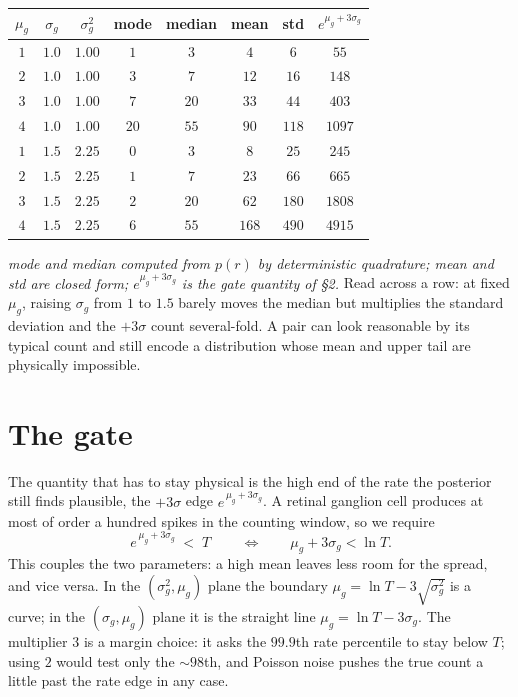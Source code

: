 \documentclass[11pt]{article}
\begin{document}
\begin{center}
\small
\begin{tabular}{cccccccc}
\hline
$\mu_g$ & $\sigma_g$ & $\sigma_g^2$ & mode & median & mean & std & $e^{\mu_g+3\sigma_g}$\\
\hline
$1$ & $1.0$ & $1.00$ & $1$  & $3$  & $4$   & $6$   & $55$\\
$2$ & $1.0$ & $1.00$ & $3$  & $7$  & $12$  & $16$  & $148$\\
$3$ & $1.0$ & $1.00$ & $7$  & $20$ & $33$  & $44$  & $403$\\
$4$ & $1.0$ & $1.00$ & $20$ & $55$ & $90$  & $118$ & $1097$\\
\hline
$1$ & $1.5$ & $2.25$ & $0$  & $3$  & $8$   & $25$  & $245$\\
$2$ & $1.5$ & $2.25$ & $1$  & $7$  & $23$  & $66$  & $665$\\
$3$ & $1.5$ & $2.25$ & $2$  & $20$ & $62$  & $180$ & $1808$\\
$4$ & $1.5$ & $2.25$ & $6$  & $55$ & $168$ & $490$ & $4915$\\
\hline
\end{tabular}
\end{center}
\noindent
\textit{mode and median computed from $p(r)$ by deterministic quadrature; mean and
std are closed form; $e^{\mu_g+3\sigma_g}$ is the gate quantity of \S2.} Read
across a row: at fixed $\mu_g$, raising $\sigma_g$ from $1$ to $1.5$ barely moves
the median but multiplies the standard deviation and the $+3\sigma$ count
several-fold. A pair can look reasonable by its typical count and still encode a
distribution whose mean and upper tail are physically impossible.

\section{The gate}
The quantity that has to stay physical is the high end of the rate the posterior
still finds plausible, the $+3\sigma$ edge $e^{\,\mu_g+3\sigma_g}$. A retinal
ganglion cell produces at most of order a hundred spikes in the counting window,
so we require
\[
\boxed{\,e^{\,\mu_g+3\sigma_g}\;<\;T\,}
\qquad\Longleftrightarrow\qquad
\mu_g+3\sigma_g<\ln T .
\]
This couples the two parameters: a high mean leaves less room for the spread, and
vice versa. In the $(\sigma_g^2,\mu_g)$ plane the boundary
$\mu_g=\ln T-3\sqrt{\sigma_g^2}$ is a curve; in the $(\sigma_g,\mu_g)$ plane it is
the straight line $\mu_g=\ln T-3\sigma_g$. The multiplier $3$ is a margin choice:
it asks the $99.9$th rate percentile to stay below $T$; using $2$ would test only
the ${\sim}98$th, and Poisson noise pushes the true count a little past the rate
edge in any case.
\end{document}
